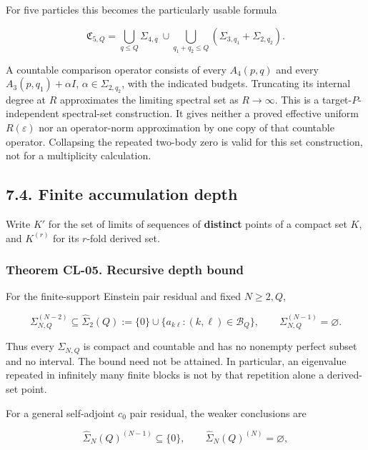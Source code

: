 \documentclass[a4paper,11pt]{article}
\numberwithin{equation}{section}
\begin{document}
For five particles this becomes the particularly usable formula

\[
\mathfrak C_{5,Q}=
\bigcup_{q\leq Q}\Sigma_{4,q}
\ \cup\!
\bigcup_{q_1+q_2\leq Q}(\Sigma_{3,q_1}+\Sigma_{2,q_2}).
\tag{CL.14}
\]

A countable comparison operator consists of every \(A_4(p,q)\) and every \(A_3(p,q_1)+\alpha I\), \(\alpha\in\Sigma_{2,q_2}\), with the indicated budgets. Truncating its internal degree at \(R\) approximates the limiting spectral set as \(R\to\infty\). This is a target-\(P\)-independent spectral-set construction. It gives neither a proved effective uniform \(R(\varepsilon)\) nor an operator-norm approximation by one copy of that countable operator. Collapsing the repeated two-body zero is valid for this set construction, not for a multiplicity calculation.

\hypertarget{finite-accumulation-depth}{%
\subsection{7.4. Finite accumulation depth}\label{finite-accumulation-depth}}

Write \(K'\) for the set of limits of sequences of \textbf{distinct} points of a compact set \(K\), and \(K^{(r)}\) for its \(r\)-fold derived set.

\hypertarget{theorem-cl-05.-recursive-depth-bound}{%
\subsubsection{Theorem CL-05. Recursive depth bound}\label{theorem-cl-05.-recursive-depth-bound}}

For the finite-support Einstein pair residual and fixed \(N\geq2,Q\),

\[
\Sigma_{N,Q}^{(N-2)}\subseteq
\widehat\Sigma_2(Q):=\{0\}\cup\{a_{k\ell}:(k,\ell)\in\mathcal B_Q\},
\qquad
\Sigma_{N,Q}^{(N-1)}=\varnothing.
\tag{CL.15}
\]

Thus every \(\Sigma_{N,Q}\) is compact and countable and has no nonempty perfect subset and no interval. The bound need not be attained. In particular, an eigenvalue repeated in infinitely many finite blocks is not by that repetition alone a derived-set point.

For a general self-adjoint \(c_0\) pair residual, the weaker conclusions are

\[
\widehat\Sigma_N(Q)^{(N-1)}\subseteq\{0\},
\qquad \widehat\Sigma_N(Q)^{(N)}=\varnothing,
\]
\end{document}
